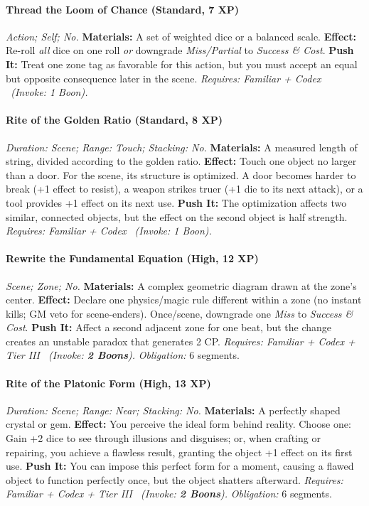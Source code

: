 \documentclass[12pt,twoside]{book}
\begin{document}
\paragraph{Thread the Loom of Chance (Standard, 7 XP)} \emph{Action; Self; No.}
\textbf{Materials:} A set of weighted dice or a balanced scale.
\textbf{Effect:} Re-roll \emph{all} dice on one roll \emph{or} downgrade \emph{Miss/Partial} to \emph{Success \& Cost}.
\textbf{Push It:} Treat one zone tag as favorable for this action, but you must accept an equal but opposite consequence later in the scene.
\emph{Requires: Familiar + Codex \ (\textit{Invoke:} 1 Boon).}
\paragraph{Rite of the Golden Ratio (Standard, 8 XP)} \emph{Duration: Scene; Range: Touch; Stacking: No.}
\textbf{Materials:} A measured length of string, divided according to the golden ratio.
\textbf{Effect:} Touch one object no larger than a door. For the scene, its structure is optimized. A door becomes harder to break (+1 effect to resist), a weapon strikes truer (+1 die to its next attack), or a tool provides +1 effect on its next use.
\textbf{Push It:} The optimization affects two similar, connected objects, but the effect on the second object is half strength.
\emph{Requires: Familiar + Codex \ (\textit{Invoke:} 1 Boon).}
\paragraph{Rewrite the Fundamental Equation (High, 12 XP)} \emph{Scene; Zone; No.}
\textbf{Materials:} A complex geometric diagram drawn at the zone's center.
\textbf{Effect:} Declare one physics/magic rule different within a zone (no instant kills; GM veto for scene-enders). Once/scene, downgrade one \emph{Miss} to \emph{Success \& Cost}.
\textbf{Push It:} Affect a second adjacent zone for one beat, but the change creates an unstable paradox that generates 2 CP.
\emph{Requires: Familiar + Codex + Tier III \ (\textit{Invoke:} \textbf{2 Boons}).}
\emph{Obligation:} 6 segments.

\paragraph{Rite of the Platonic Form (High, 13 XP)} \emph{Duration: Scene; Range: Near; Stacking: No.}
\textbf{Materials:} A perfectly shaped crystal or gem.
\textbf{Effect:} You perceive the ideal form behind reality. Choose one: Gain +2 dice to see through illusions and disguises; or, when crafting or repairing, you achieve a flawless result, granting the object +1 effect on its first use.
\textbf{Push It:} You can impose this perfect form for a moment, causing a flawed object to function perfectly once, but the object shatters afterward.
\emph{Requires: Familiar + Codex + Tier III \ (\textit{Invoke:} \textbf{2 Boons}).}
\emph{Obligation:} 6 segments.
\end{document}

